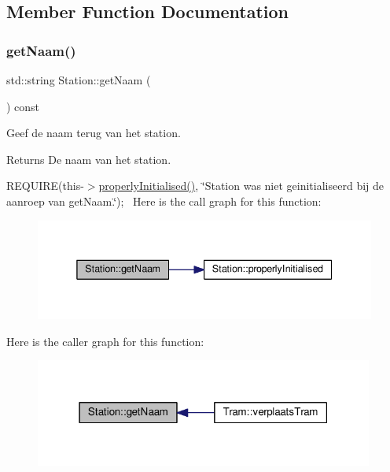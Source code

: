 \subsection{Member Function Documentation}
\mbox{\label{class_station_aea6c31c39a5e1eb4c30337e7ce489e69}} 
\subsubsection{\texorpdfstring{get\+Naam()}{getNaam()}}
{\footnotesize\ttfamily std\+::string Station\+::get\+Naam (\begin{DoxyParamCaption}{ }\end{DoxyParamCaption}) const}



Geef de naam terug van het station. 

\begin{DoxyReturn}{Returns}
De naam van het station.
\end{DoxyReturn}
R\+E\+Q\+U\+I\+RE(this-\/$>$\hyperlink{class_station_a9ce626dd0599e3ea8107404a59c21e16}{properly\+Initialised()}, \char`\"{}\+Station was niet geinitialiseerd bij de aanroep van get\+Naam.\char`\"{});~\newline
Here is the call graph for this function\+:
\nopagebreak
\begin{figure}[H]
\begin{center}
\leavevmode
\includegraphics[width=338pt]{class_station_aea6c31c39a5e1eb4c30337e7ce489e69_cgraph}
\end{center}
\end{figure}
Here is the caller graph for this function\+:
\nopagebreak
\begin{figure}[H]
\begin{center}
\leavevmode
\includegraphics[width=316pt]{class_station_aea6c31c39a5e1eb4c30337e7ce489e69_icgraph}
\end{center}
\end{figure}
\mbox{\label{class_station_a5230690094cdfd1e9f443d76f35c8a19}} 
